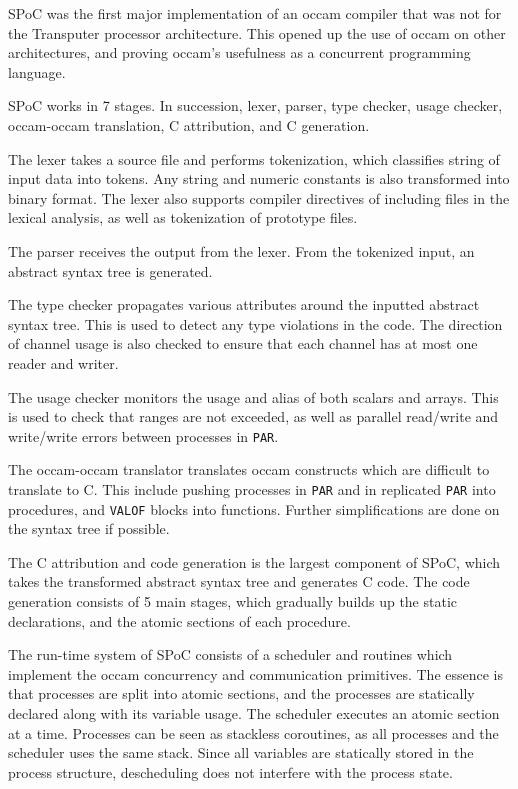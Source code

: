 SPoC was the first major implementation of an occam compiler that was not for the Transputer processor architecture. This opened up the use of occam on other architectures, and proving occam's usefulness as a concurrent programming language.

SPoC works in 7 stages. In succession, lexer, parser, type checker, usage checker, occam\hyp{}occam translation, C attribution, and C generation. 

The lexer takes a source file and performs tokenization, which classifies string of input data into tokens. Any string and numeric constants is also transformed into binary format. The lexer also supports compiler directives of including files in the lexical analysis, as well as tokenization of prototype files.

The parser receives the output from the lexer. From the tokenized input, an abstract syntax tree is generated.

The type checker propagates various attributes around the inputted abstract syntax tree. This is used to detect any type violations in the code. The direction of channel usage is also checked to ensure that each channel has at most one reader and writer. 

The usage checker monitors the usage and alias of both scalars and arrays. This is used to check that ranges are not exceeded, as well as parallel read/write and write/write errors  between processes in \texttt{PAR}. 

The occam\hyp{}occam translator translates occam constructs which are difficult to translate to C. This include pushing processes in \texttt{PAR} and in replicated \texttt{PAR} into procedures, and \texttt{VALOF} blocks into functions. Further simplifications are done on the syntax tree if possible. 

The C attribution and code generation is the largest component of SPoC, which takes the transformed abstract syntax tree and generates C code. The code generation consists of 5 main stages, which gradually builds up the static declarations, and the atomic sections of each procedure. 

The run\hyp{}time system of SPoC consists of a scheduler and routines which implement the occam concurrency and communication primitives. The essence is that processes are split into atomic sections, and the processes are statically declared along with its variable usage. The scheduler executes an atomic section at a time. Processes can be seen as stackless coroutines, as all processes and the scheduler uses the same stack. Since all variables are statically stored in the process structure, descheduling does not interfere with the process state. 


